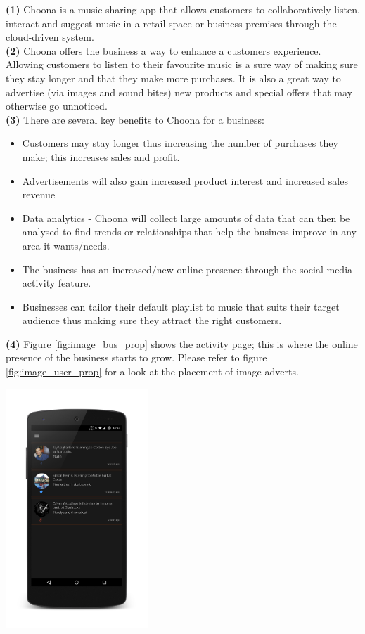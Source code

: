 \textbf{(1)} Choona is a music-sharing app that allows customers to collaboratively listen, interact and suggest music in a retail space or business premises through the cloud-driven system.  \\

\textbf{(2)} Choona offers the business a way to enhance a customers experience.  Allowing customers to listen to their favourite music is a sure way of making sure they stay longer and that they make more purchases.  It is also a great way to advertise (via images and sound bites) new products and special offers that may otherwise go unnoticed.  \\

\textbf{(3)} There are several key benefits to Choona for a business:
\begin{itemize}
\item Customers may stay longer thus increasing the number of purchases they make; this increases sales and profit.
\item Advertisements will also gain increased product interest and increased sales revenue
\item Data analytics - Choona will collect large amounts of data that can then be analysed to find trends or relationships that help the business improve in any area it wants/needs.  
\item The business has an increased/new online presence through the social media activity feature. 
\item Businesses can tailor their default playlist to music that suits their target audience thus making sure they attract the right customers.
\end{itemize} 

\textbf{(4)} Figure \ref{fig:image_bus_prop} shows the activity page; this is where the online presence of the business starts to grow.  Please refer to figure \ref{fig:image_user_prop} for a look at the placement of image adverts.\\
\begin{minipage}{\linewidth}
\centering
\includegraphics[width=0.4\textwidth]{./img/idea_bus_prop.png}
\label{fig:image_bus_prop}
\end{minipage}\\

